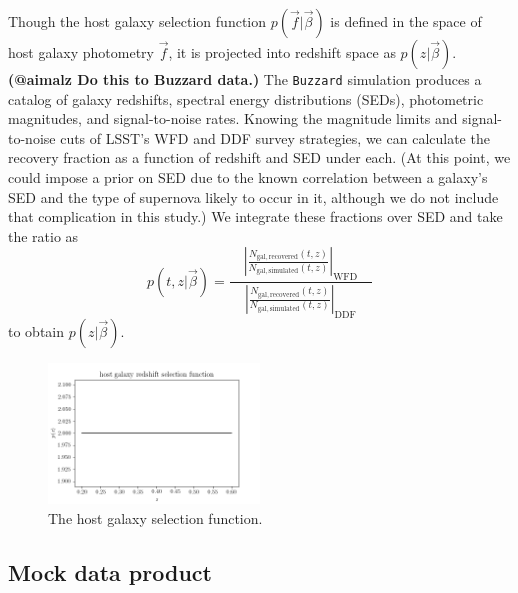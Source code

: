 \documentclass[12pt, twocolumn]{emulateapj}
\begin{document}
Though the host galaxy selection function $p(\vec{f} | \vec{\beta})$ is defined in the space of host galaxy photometry $\vec{f}$, it is projected into redshift space as $p(z | \vec{\beta})$.  \textbf{(@aimalz Do this to Buzzard data.)}  
The \texttt{Buzzard} simulation produces a catalog of galaxy redshifts, spectral energy distributions (SEDs), photometric magnitudes, and signal-to-noise rates.  
Knowing the magnitude limits and signal-to-noise cuts of LSST's WFD and DDF survey strategies, we can calculate the recovery fraction as a function of redshift and SED under each.  
(At this point, we could impose a prior on SED due to the known correlation between a galaxy's SED and the type of supernova likely to occur in it, although we do not include that complication in this study.)  
We integrate these fractions over SED and take the ratio as
\begin{equation}
    \label{eq:hostselfunwords}
     p(t, z | \vec{\beta}) = \frac
     {\quad\left|\frac
     	{N_{\mathrm{gal, recovered}}(t,z)}
     	{N_{\mathrm{gal,simulated}}(t,z)}\right|_\mathrm{WFD}\quad}
     {\left|\frac
     		{N_{\mathrm{gal, recovered}}(t,z)}
     		{N_{\mathrm{gal,simulated}}(t,z)}\right|_\mathrm{DDF}}
\end{equation}
to obtain $p(z | \vec{\beta})$.

\begin{figure}
	\begin{center}
		\includegraphics[width=0.5\textwidth]{fig/pz_sel_fun.png}
		\caption{The host galaxy selection function.}
		\label{fig:hostselfun}
	\end{center}
\end{figure}

\subsection{Mock data product}
\label{sec:finalmockdata}
\end{document}
